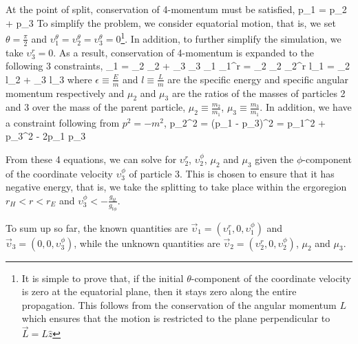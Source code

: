 At the point of split, conservation of 4-momentum must be satisfied,
\be
	p_{1\mu} = p_{2\mu} + p_{3\mu}
\ee
To simplify the problem, we consider equatorial motion, that is, we set $\theta = \frac{\pi}{2}$ and $\upsilon_1^{\theta} = \upsilon_2^{\theta} =\upsilon_3^{\theta} = 0$\footnote{It is simple to prove that, if the initial $\theta$-component of the coordinate velocity is zero at the equatorial plane, then it stays zero along the entire propagation. This follows from the conservation of the angular momentum $L$ which ensures that the motion is restricted to the plane perpendicular to $\vec{L} = L\hat{z}$}. In addition, to further simplify the simulation, we take $\upsilon_3^{r} = 0$. As a result, conservation of 4-momentum is expanded to the following 3 constraints,
\be\label{E_CONS}
	\epsilon_1 = \mu_2 \epsilon_2 + \mu_3 \epsilon_3 \Rightarrow {}
\ee
\be\label{ur_CONS}
	_1 \upsilon_{1}^{r} = \mu_2 _2 \upsilon_{2}^{r} \Rightarrow {}
\ee
\be\label{L_CONS}
	l_1 = \mu_2 l_2 + \mu_3 l_3 \Rightarrow {}
\ee
where $\epsilon\equiv\frac{E}{m}$ and $l\equiv\frac{L}{m}$ are the specific energy and specific angular momentum respectively and $\mu_2$ and $\mu_3$ are the ratios of the masses of particles 2 and 3 over the mass of the parent particle, $\mu_2 \equiv \frac{m_2}{m_1}$, $\mu_3\equiv\frac{m_3}{m_1}$. In addition, we have a constraint following from $p^2 = -m^2$,
\be\label{M_CONS}
	p_2^2 = (p_1 - p_3)^2 = p_1^2 + p_3^2 - 2p_{1} \cdot p_{3} \Rightarrow {}
\ee

From these 4 equations, we can solve for $\upsilon_{2}^{r}$, $\upsilon_{2}^{\phi}$, $\mu_2$ and $\mu_3$ given the $\phi$-component of the coordinate velocity $\upsilon_{3}^{\phi}$ of particle 3. This is chosen to ensure that it has negative energy, that is, we take the splitting to take place within the ergoregion $r_{H}<r<r_{E}$ and $\upsilon_{3}^{\phi} < -\frac{g_{tt}}{g_{t\phi}}$.

To sum up so far, the known quantities are $\vec{\upsilon}_1 = (\upsilon_{1}^{r},0,\upsilon_{1}^{\phi})$ and $\vec{\upsilon}_3 = (0,0,\upsilon_{3}^{\phi})$, while the unknown quantities are $\vec{\upsilon}_2 = (\upsilon_{2}^{r},0,\upsilon_{2}^{\phi})$, $\mu_2$ and $\mu_3$.

